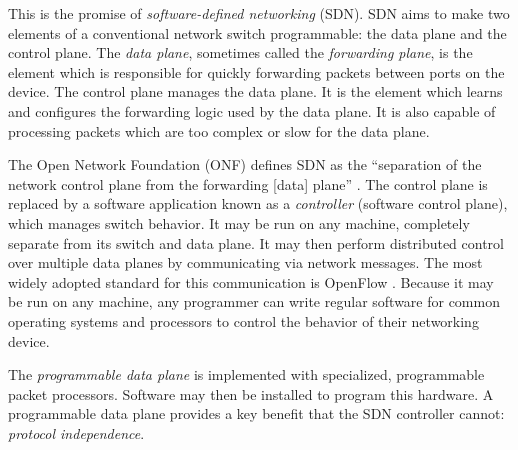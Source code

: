 This is the promise of \emph{software-defined networking} (SDN). 
SDN aims to make two elements of a conventional network switch programmable: the data plane and the control plane. The \emph{data plane}, sometimes called the \emph{forwarding plane}, is the element which is responsible for quickly forwarding packets between ports on the device. The control plane manages the data plane. It is the element which learns and configures the forwarding logic used by the data plane. It is also capable of processing packets which are too complex or slow for the data plane.

The Open Network
Foundation (ONF) defines SDN as the ``separation of the network control
plane from the forwarding [data] plane'' \cite{onf_sdn_def}.
The control plane is replaced by a software application known as a \emph{controller} (software control plane), which manages switch behavior.
It may be run on any machine, completely separate from its switch and data plane.
It may then perform distributed control over multiple data planes by communicating via network messages.
The most widely adopted standard for this communication is OpenFlow
\cite{openflow_spec}.
Because it may be run on any machine,
any programmer can write regular software for common operating
systems and processors to control the behavior of their networking device.

The \emph{programmable data plane} is implemented with specialized, programmable packet processors. 
Software may then be installed to program this hardware.
A programmable data plane provides
a key benefit that the SDN controller cannot: \emph{protocol independence}.



